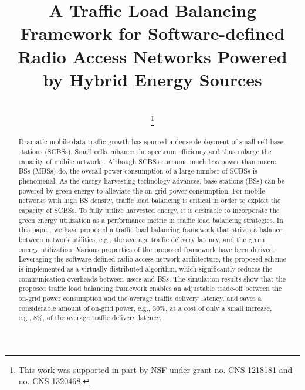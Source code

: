 \documentclass[journal]{IEEEtran}
\theoremstyle{definition}
\begin{document}
\title{A Traffic Load Balancing Framework for Software-defined Radio Access Networks Powered by Hybrid Energy Sources}
\author{\\
\thanks{This work was supported in part by NSF under grant no. CNS-1218181 and no. CNS-1320468.}}
\maketitle
\begin{abstract}
Dramatic mobile data traffic growth has spurred a dense deployment of small cell base stations (SCBSs). Small cells enhance the spectrum efficiency and thus enlarge the capacity of mobile networks. Although SCBSs consume much less power than macro BSs (MBSs) do, the overall power consumption of a large number of SCBSs is phenomenal. As the energy harvesting technology advances, base stations (BSs) can be powered by green energy to alleviate the on-grid power consumption. For mobile networks with high BS density, traffic load balancing is critical in order to exploit the capacity of SCBSs. To fully utilize harvested energy, it is desirable to incorporate the green energy utilization as a performance metric in traffic load balancing strategies. In this paper, we have proposed a traffic load balancing framework that strives a balance between network utilities, e.g., the average traffic delivery latency, and the green energy utilization. Various properties of the proposed framework have been derived. Leveraging the software-defined radio access network architecture, the proposed scheme is implemented as a virtually distributed algorithm, which significantly reduces the communication overheads between users and BSs. The simulation results show that the proposed traffic load balancing framework enables an adjustable trade-off between the on-grid power consumption and the average traffic delivery latency, and saves a considerable amount of on-grid power, e.g., 30\%, at a cost of only a small increase, e.g., 8\%, of the average traffic delivery latency.

\end{abstract}
\IEEEpeerreviewmaketitle
\end{document}

